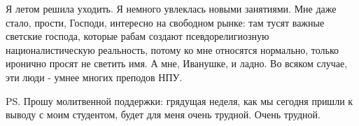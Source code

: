 Я летом решила уходить. Я немного увлеклась новыми занятиями. Мне даже стало,
прости, Господи, интересно на свободном рынке: там тусят важные светские
господа, которые рабам создают псевдорелигиозную  националистическую
реальность, потому ко мне относятся нормально, только иронично просят не
светить имя. А мне, Иванушке, и ладно. Во всяком случае, эти люди - умнее
многих преподов НПУ.

PS. Прошу молитвенной поддержки: грядущая неделя, как мы сегодня пришли к
выводу с моим студентом, будет для меня очень трудной. Очень трудной.
